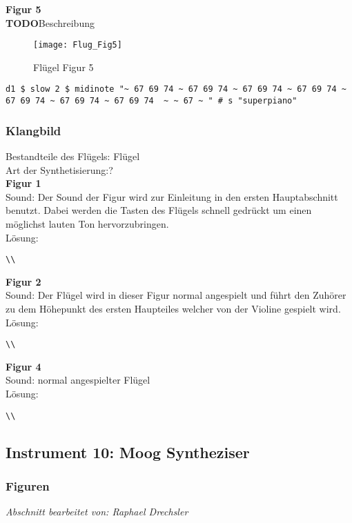 \documentclass[
10pt, %
a4paper, %
oneside, %
headinclude,footinclude, %
BCOR5mm, %
]{scrartcl}
\begin{document}
\noindent \textbf{Figur 5}\\
{\color{red}\textbf{TODO}}Beschreibung\\
\begin{figure}[h]
	\centering 
	\texttt{[image: Flug\_Fig5]} 
	\caption{Flügel Figur 5}
\end{figure}
\begin{lstlisting}
d1 $ slow 2 $ midinote "~ 67 69 74 ~ 67 69 74 ~ 67 69 74 ~ 67 69 74 ~ 67 69 74 ~ 67 69 74 ~ 67 69 74  ~ ~ 67 ~ " # s "superpiano"
\end{lstlisting}


\subsubsection{Klangbild}
Bestandteile des Flügels: Flügel\\
Art der Synthetisierung:?\\
\noindent \textbf{Figur 1}\\
Sound: Der Sound der Figur wird zur Einleitung in den ersten Hauptabschnitt benutzt. Dabei werden die Tasten des Flügels 
schnell gedrückt um einen möglichst lauten Ton hervorzubringen.\\
Lösung:\\
\begin{lstlisting}
\\
\end{lstlisting}
\noindent \textbf{Figur 2}\\
Sound: Der Flügel wird in dieser Figur normal angespielt und führt den Zuhörer zu dem Höhepunkt des ersten Haupteiles welcher von der Violine gespielt wird.\\
Lösung:\\
\begin{lstlisting}
\\
\end{lstlisting}
\noindent \textbf{Figur 4}\\
Sound: normal angespielter Flügel\\
Lösung:\\
\begin{lstlisting}
\\
\end{lstlisting}

\subsection{Instrument 10: Moog Syntheziser}
\subsubsection{Figuren}
\textit{Abschnitt bearbeitet von: Raphael Drechsler}\\
\end{document}

